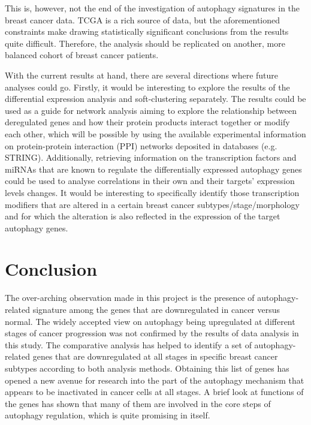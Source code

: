 This is, however, not the end of the investigation of autophagy signatures in the breast cancer data. 
TCGA is a rich source of data, but the aforementioned constraints make drawing statistically significant conclusions from the results quite difficult. Therefore, the analysis should be  replicated on another, more balanced cohort of breast cancer patients. 

With the current results at hand, there are several directions where future analyses could go. Firstly, it would be interesting to explore the results of the differential expression analysis and soft-clustering separately. The results could be used as a guide for network analysis aiming to explore the relationship between deregulated genes and how their protein products interact together or modify each other, which will be possible by using the available experimental information on protein-protein interaction (PPI) networks deposited in databases (e.g. STRING). Additionally, retrieving information on the transcription factors and miRNAs that are known to regulate the differentially expressed autophagy genes could be used to analyse correlations in their own and their targets’ expression levels changes. It would be interesting to specifically identify those transcription modifiers that are altered in a certain breast cancer subtypes/stage/morphology and for which the alteration is also reflected in the expression of the target autophagy genes. 

\section{Conclusion}


The over-arching observation made in this project is the presence of autophagy-related signature among the genes that are downregulated in cancer versus normal. The widely accepted view on autophagy being upregulated at different stages of cancer progression was not confirmed by the results of data analysis in this study.
The comparative analysis has helped to identify a set of autophagy-related genes that are downregulated at all stages in specific breast cancer subtypes according to both analysis methods. Obtaining this list of genes has opened a new avenue for research into the part of the autophagy mechanism that appears to be inactivated in cancer cells at all stages. A brief look at functions of the genes has shown that many of them are involved in the core steps of autophagy regulation, which is quite promising in itself. 

